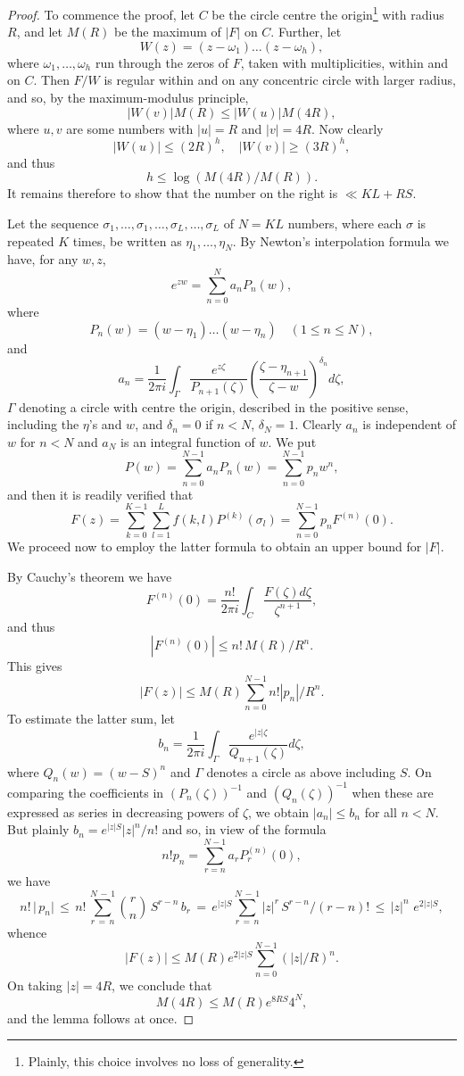\begin{proof}
To commence the proof, let $C$ be the circle centre the origin\footnote{Plainly, this choice involves no loss of generality.} with radius $R$, and let $M(R)$ be the maximum of $|F|$ on $C$. Further, let
\[W(z) = (z - \omega_1) \dots (z - \omega_h),\]
where $\omega_1, \ldots, \omega_h$ run through the zeros of $F$, taken with multiplicities, within and on $C$. Then $F/W$ is regular within and on any concentric circle with larger radius, and so, by the maximum-modulus principle,
\[|W(v)|M(R) \leq |W(u)|M(4R),\]
where $u, v$ are some numbers with $|u| = R$ and $|v| = 4R$. Now clearly
\[|W(u)| \leq (2R)^h, \quad |W(v)| \geq (3R)^h,\]
and thus
\[h \leqslant \log (M(4R)/M(R)).\]
It remains therefore to show that the number on the right is $\ll KL + RS$.

Let the sequence $\sigma_1, \ldots, \sigma_1, \ldots, \sigma_L, \ldots, \sigma_L$ of $N = KL$ numbers, where each $\sigma$ is repeated $K$ times, be written as $\eta_1, \ldots, \eta_N$. By Newton's interpolation formula we have, for any $w, z$,
\[e^{zw} = \sum_{n=0}^{N} a_n P_n(w),\]
where
\[P_n(w) = (w - \eta_1) \dots (w - \eta_n) \quad (1 \le n \le N),\]
and
\[a_n = \frac{1}{2\pi i} \int_{\Gamma} \frac{e^{z\zeta}}{P_{n+1}(\zeta)} \left( \frac{\zeta - \eta_{n+1}}{\zeta - w} \right)^{\delta_n} d\zeta,\]
$\Gamma$ denoting a circle with centre the origin, described in the positive sense, including the $\eta$'s and $w$, and $\delta_n = 0$ if $n < N$, $\delta_N = 1$. Clearly $a_n$ is independent of $w$ for $n < N$ and $a_N$ is an integral function of $w$. We put
\[P(w) = \sum_{n=0}^{N-1} a_n P_n(w) = \sum_{n=0}^{N-1} p_n w^n,\]
and then it is readily verified that
\[F(z) = \sum_{k=0}^{K-1} \sum_{l=1}^{L} f(k,l) P^{(k)}(\sigma_l) = \sum_{n=0}^{N-1} p_n F^{(n)}(0).\]
We proceed now to employ the latter formula to obtain an upper bound for $|F|$.

By Cauchy's theorem we have
\[F^{(n)}(0) = \frac{n!}{2\pi i} \int_C \frac{F(\zeta) d\zeta}{\zeta^{n+1}},\]
and thus
\[\left|F^{(n)}(0)\right| \leqslant n! \, M(R)/R^n.\]
This gives
\[|F(z)| \leqslant M(R) \sum_{n=0}^{N-1} n! |p_n|/R^n.\]
To estimate the latter sum, let
\[b_n = \frac{1}{2\pi i} \int_{\Gamma} \frac{e^{|z|\zeta}}{Q_{n+1}(\zeta)} d\zeta,\]
where $Q_n(w) = (w-S)^n$ and $\Gamma$ denotes a circle as above including $S$. On comparing the coefficients in $(P_n(\zeta))^{-1}$ and $(Q_n(\zeta))^{-1}$ when these are expressed as series in decreasing powers of $\zeta$, we obtain $|a_n| \leq b_n$ for all $n < N$. But plainly $b_n = e^{|z|S} |z|^n/n!$ and so, in view of the formula
\[n! p_n = \sum_{r=n}^{N-1} a_r P_r^{(n)}(0),\]
we have
\[n! \, \big| \, p_n \big| \, \leqslant \, n! \, \sum_{r \, = \, n}^{N \, - \, 1} \binom{r}{n} \, S^{r - n} \, b_r \, = \, e^{|z| S} \sum_{r \, = \, n}^{N \, - \, 1} \big| z \big|^r \, S^{r - n} / (r - n)! \, \leqslant \, \big| z \big|^n \, \, e^{2|z|S},\]
whence
\[|F(z)| \leq M(R) e^{2|z|S} \sum_{n=0}^{N-1} (|z|/R)^n.\]
On taking $|z| = 4R$, we conclude that
\[M(4R) \leqslant M(R) e^{8RS} 4^N,\]
and the lemma follows at once.
\end{proof}

